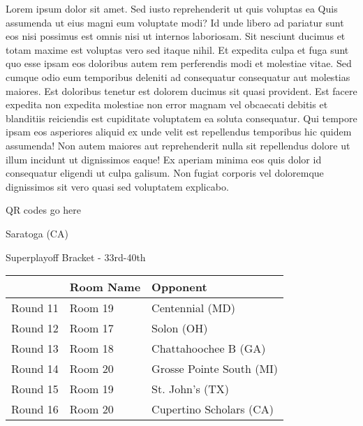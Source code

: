 \documentclass{article}%
\begin{document}
\vspace*{8pt}%
\linebreak%
\newline%
\newline%
    Lorem ipsum dolor sit amet. Sed iusto reprehenderit ut quis voluptas ea Quis assumenda ut eius magni eum voluptate modi? Id unde libero ad pariatur sunt eos nisi possimus est omnis nisi ut internos laboriosam. Sit nesciunt ducimus et totam maxime est voluptas vero sed itaque nihil. Et expedita culpa et fuga sunt quo esse ipsam eos doloribus autem rem perferendis modi et molestiae vitae.\newline%
\newline%
    Sed cumque odio eum temporibus deleniti ad consequatur consequatur aut molestias maiores. Est doloribus tenetur est dolorem ducimus sit quasi provident. Est facere expedita non expedita molestiae non error magnam vel obcaecati debitis et blanditiis reiciendis est cupiditate voluptatem ea soluta consequatur. Qui tempore ipsam eos asperiores aliquid ex unde velit est repellendus temporibus hic quidem assumenda!\newline%
\newline%
    Non autem maiores aut reprehenderit nulla sit repellendus dolore ut illum incidunt ut dignissimos eaque! Ex aperiam minima eos quis dolor id consequatur eligendi ut culpa galisum. Non fugiat corporis vel doloremque dignissimos sit vero quasi sed voluptatem explicabo.\newline%
\newline%
\vspace*{30pt}%
\begin{center}%
\begin{Huge}%
QR codes go here%
\end{Huge}%
\end{center}%
\newpage%
\begin{center}%
\begin{Huge}%
Saratoga (CA)%
\end{Huge}%
\vspace*{8pt}%
\linebreak%
\begin{Large}%
Superplayoff Bracket {-} 33rd{-}40th%
\end{Large}%
\end{center}%
%
\begin{tabularx}{\textwidth}{|c|Y|Y|}%
\hline%
&Room Name&Opponent\\%
\hline%
Round 11&Room 19&Centennial (MD)\\%
Round 12&Room 17&Solon (OH)\\%
Round 13&Room 18&Chattahoochee B (GA)\\%
Round 14&Room 20&Grosse Pointe South (MI)\\%
Round 15&Room 19&St. John's (TX)\\%
Round 16&Room 20&Cupertino Scholars (CA)\\%
\hline%
\end{tabularx}%
\end{document}

